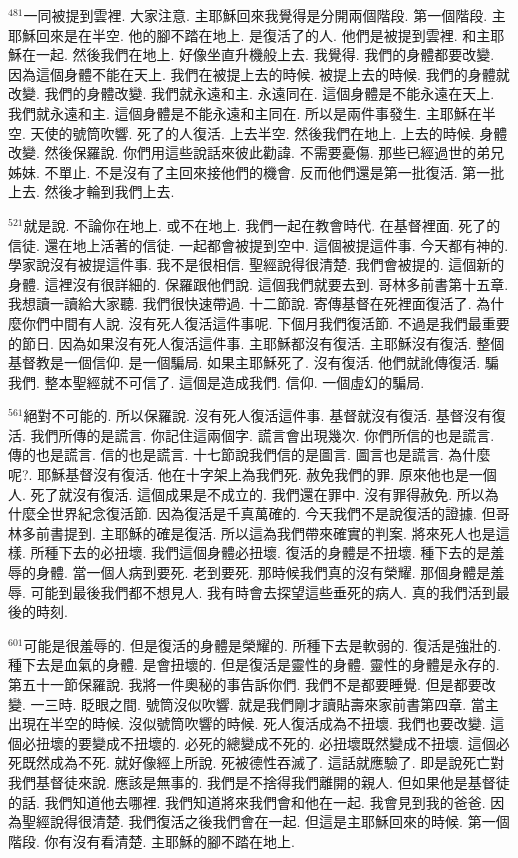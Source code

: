 \documentclass{book}
\begin{document}
$^{481}$一同被提到雲裡.
大家注意.
主耶穌回來我覺得是分開兩個階段.
第一個階段.
主耶穌回來是在半空.
他的腳不踏在地上.
是復活了的人.
他們是被提到雲裡.
和主耶穌在一起.
然後我們在地上.
好像坐直升機般上去.
我覺得.
我們的身體都要改變.
因為這個身體不能在天上.
我們在被提上去的時候.
被提上去的時候.
我們的身體就改變.
我們的身體改變.
我們就永遠和主.
永遠同在.
這個身體是不能永遠在天上.
我們就永遠和主.
這個身體是不能永遠和主同在.
所以是兩件事發生.
主耶穌在半空.
天使的號筒吹響.
死了的人復活.
上去半空.
然後我們在地上.
上去的時候.
身體改變.
然後保羅說.
你們用這些說話來彼此勸諱.
不需要憂傷.
那些已經過世的弟兄姊妹.
不單止.
不是沒有了主回來接他們的機會.
反而他們還是第一批復活.
第一批上去.
然後才輪到我們上去.

$^{521}$就是說.
不論你在地上.
或不在地上.
我們一起在教會時代.
在基督裡面.
死了的信徒.
還在地上活著的信徒.
一起都會被提到空中.
這個被提這件事.
今天都有神的.
學家說沒有被提這件事.
我不是很相信.
聖經說得很清楚.
我們會被提的.
這個新的身體.
這裡沒有很詳細的.
保羅跟他們說.
這個我們就要去到.
哥林多前書第十五章.
我想讀一讀給大家聽.
我們很快速帶過.
十二節說.
寄傳基督在死裡面復活了.
為什麼你們中間有人說.
沒有死人復活這件事呢.
下個月我們復活節.
不過是我們最重要的節日.
因為如果沒有死人復活這件事.
主耶穌都沒有復活.
主耶穌沒有復活.
整個基督教是一個信仰.
是一個騙局.
如果主耶穌死了.
沒有復活.
他們就訛傳復活.
騙我們.
整本聖經就不可信了.
這個是造成我們.
信仰.
一個虛幻的騙局.

$^{561}$絕對不可能的.
所以保羅說.
沒有死人復活這件事.
基督就沒有復活.
基督沒有復活.
我們所傳的是謊言.
你記住這兩個字.
謊言會出現幾次.
你們所信的也是謊言.
傳的也是謊言.
信的也是謊言.
十七節說我們信的是圖言.
圖言也是謊言.
為什麼呢?.
耶穌基督沒有復活.
他在十字架上為我們死.
赦免我們的罪.
原來他也是一個人.
死了就沒有復活.
這個成果是不成立的.
我們還在罪中.
沒有罪得赦免.
所以為什麼全世界紀念復活節.
因為復活是千真萬確的.
今天我們不是說復活的證據.
但哥林多前書提到.
主耶穌的確是復活.
所以這為我們帶來確實的判案.
將來死人也是這樣.
所種下去的必扭壞.
我們這個身體必扭壞.
復活的身體是不扭壞.
種下去的是羞辱的身體.
當一個人病到要死.
老到要死.
那時候我們真的沒有榮耀.
那個身體是羞辱.
可能到最後我們都不想見人.
我有時會去探望這些垂死的病人.
真的我們活到最後的時刻.

$^{601}$可能是很羞辱的.
但是復活的身體是榮耀的.
所種下去是軟弱的.
復活是強壯的.
種下去是血氣的身體.
是會扭壞的.
但是復活是靈性的身體.
靈性的身體是永存的.
第五十一節保羅說.
我將一件奧秘的事告訴你們.
我們不是都要睡覺.
但是都要改變.
一三時.
眨眼之間.
號筒沒似吹響.
就是我們剛才讀貼壽來家前書第四章.
當主出現在半空的時候.
沒似號筒吹響的時候.
死人復活成為不扭壞.
我們也要改變.
這個必扭壞的要變成不扭壞的.
必死的總變成不死的.
必扭壞既然變成不扭壞.
這個必死既然成為不死.
就好像經上所說.
死被德性吞滅了.
這話就應驗了.
即是說死亡對我們基督徒來說.
應該是無事的.
我們是不捨得我們離開的親人.
但如果他是基督徒的話.
我們知道他去哪裡.
我們知道將來我們會和他在一起.
我會見到我的爸爸.
因為聖經說得很清楚.
我們復活之後我們會在一起.
但這是主耶穌回來的時候.
第一個階段.
你有沒有看清楚.
主耶穌的腳不踏在地上.
\end{document}
